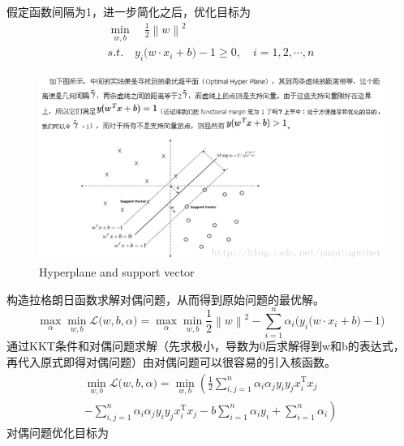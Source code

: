 \documentclass{ctexart}
\begin{document}
\begin{description}
假定函数间隔为1，进一步简化之后，优化目标为
\begin{equation}
\begin{array}{lcl}
\min\limits_{w,b}\quad \frac{1}{2}\left\|w\right\|^2\\
s.t. \quad y_i\big(w\cdot x_i+b\big)-1\ge0,\quad i=1,2,\cdots,n
\end{array}
\end{equation}

\begin{figure}[H]
\begin{center}
\includegraphics[width=1\textwidth]{fig/hyper.png} %
\caption{Hyperplane and support vector}
\end{center}
\end{figure}
构造拉格朗日函数求解对偶问题，从而得到原始问题的最优解。
\begin{equation}
\max\limits_{\alpha}\min\limits_{w,b}\mathcal{L}\big(w,b,\alpha \big)= \max\limits_{\alpha}\min\limits_{w,b} \frac{1}{2}\left\|w\right\|^2-\sum_{i=1}^{n}\alpha_i\big( y_i\big(w\cdot x_i+b\big)-1\big)
\end{equation}
通过KKT条件和对偶问题求解（先求极小，导数为0后求解得到w和b的表达式，再代入原式即得对偶问题）由对偶问题可以很容易的引入核函数。
\begin{equation}
\begin{array}{lcl}
\min\limits_{w,b}\mathcal{L}\big(w,b,\alpha \big)= \min\limits_{w,b}\left( \frac{1}{2}\sum\limits_{i,j=1}^{n}\alpha_i\alpha_{j}y_{i}y_{j}x_{i}^{\mathrm{T}}x_j \right. \\ 
\left. -\sum\limits_{i,j=1}^{n}\alpha_i\alpha_{j}y_{i}y_{j}x_{i}^{\mathrm{T}}x_j -b\sum\limits_{i=1}^{n}\alpha_{i}y_i+\sum\limits_{i=1}^{n}\alpha_{i}\right)
\end{array}
\end{equation}
对偶问题优化目标为

\end{description}
\end{document}
